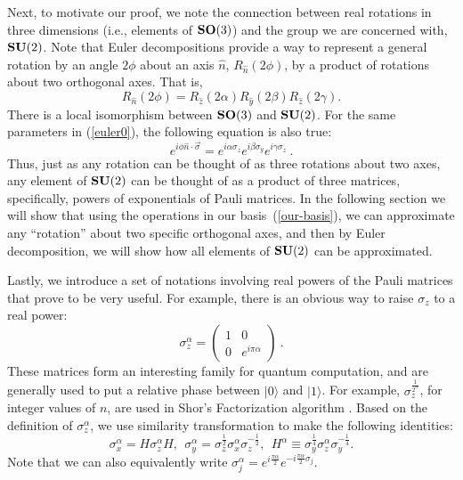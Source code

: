 \documentclass[twocolumn,11pt]{article}
\begin{document}
Next, to motivate our proof, we note the connection between real rotations
in three dimensions (i.e., elements of $\mbox{\bf SO}(3)$) and the group we
are concerned
with, $\mbox{\bf SU}(2)$. Note that Euler decompositions provide a way to 
represent a general rotation by an angle $2\phi$ about an axis $\hat{n}$, 
$R_{\hat{n}}(2\phi)$, by a product of rotations about two orthogonal
axes. That is,
\begin{equation}\label{euler0}
R_{\hat{n}}(2\phi)=
R_{\hat{z}}(2\alpha)R_{\hat{y}}(2\beta)R_{\hat{z}}(2\gamma).
\end{equation} 
There is a local isomorphism between $\mbox{\bf SO}(3)$ and $\mbox{\bf SU}(2)$.
For the same parameters in (\ref{euler0}), the following equation is
also true: 
\begin{equation}\label{euler1} e^{i\phi\hat{n} \cdot
\vec{\sigma}}=e^{i\alpha\sigma_z} e^{i\beta\sigma_y} e^{i\gamma\sigma_z} \ .
\end{equation} 
Thus, just as any rotation can be thought of as three rotations about
two axes, any element of $\mbox{\bf SU}(2)$ can be thought of as a product
of three
matrices, specifically, powers of exponentials of Pauli matrices.  In the
following section we will show that using the operations in 
our basis~(\ref{our-basis}),
we can approximate any ``rotation'' about two specific orthogonal axes,
and then by Euler decomposition, we will show how all elements of $\mbox{\bf
SU}(2)$
can be approximated.

Lastly, we introduce a set of notations involving real
powers of the Pauli matrices that prove to be very useful.
For example, there is an obvious way to raise $\sigma_z$ to a real power:
\[ \sigma_z^\alpha=\left(
\begin{array}{cc} 1 & 0 \\ 0 & e^{i\pi\alpha} \end{array} \right) \ .
\]
These matrices form an interesting family
for quantum computation, and are generally used to
put a relative phase between $|0\rangle$ and $|1\rangle$. For example,
 $\sigma_z^{\frac{1}{2^{n}}}$, for integer values of $n$, are used in Shor's
Factorization algorithm \cite{shorFactor}.  Based on the definition of
$\sigma_z^{\alpha}$, we use  similarity transformation to make the
following identities:
\[ \sigma_x^\alpha=
H\sigma_z^{\alpha}H, \ \
\sigma_y^{\alpha}=\sigma_z^{\frac{1}{2}}\sigma_x^{\alpha}\sigma_z^{-
\frac{1}{2}}, \ \
H^\alpha\equiv\sigma_y^{\frac{1}{4}}\sigma_z^{\alpha}\sigma_y^{-
\frac{1}{4}} .
\]
Note that we can also equivalently write $\displaystyle
\sigma_j^\alpha=e^{i\frac{\pi\alpha}{2}}e^{-
i\frac{\pi\alpha}{2}\sigma_j}$.
\end{document}
